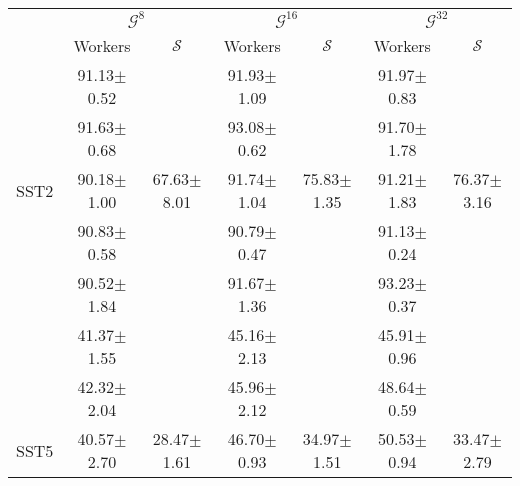 \begin{table*}[h]
\centering\scriptsize\renewcommand{\arraystretch}{1.2}\setlength{\tabcolsep}{4pt}
\begin{tabular}{c|cc|cc|cc|}
\cline{2-7}
                             & \multicolumn{2}{c|}{$\mathcal{G}^8$}                    & \multicolumn{2}{c|}{$\mathcal{G}^{16}$}                 & \multicolumn{2}{c|}{$\mathcal{G}^{32}$}                    \\ \cline{2-7} 
                             & \multicolumn{1}{c|}{Workers}        &  $\mathcal{S}$    & \multicolumn{1}{c|}{Workers}        & $\mathcal{S}$     & \multicolumn{1}{c|}{Workers}        & $\mathcal{S}$             \\ \hline
\multicolumn{1}{|c|}{}       & \multicolumn{1}{c|}{91.13$\pm$0.52} &                   & \multicolumn{1}{c|}{91.93$\pm$1.09} &                   & \multicolumn{1}{c|}{91.97$\pm$0.83} &                   \\
\multicolumn{1}{|c|}{}       & \multicolumn{1}{c|}{91.63$\pm$0.68} &                   & \multicolumn{1}{c|}{93.08$\pm$0.62} &                   & \multicolumn{1}{c|}{91.70$\pm$1.78} &                   \\
\multicolumn{1}{|c|}{SST2}   & \multicolumn{1}{c|}{90.18$\pm$1.00} & 67.63$\pm$8.01    & \multicolumn{1}{c|}{91.74$\pm$1.04} & 75.83$\pm$1.35    & \multicolumn{1}{c|}{91.21$\pm$1.83} & 76.37$\pm$3.16 \\
\multicolumn{1}{|c|}{}       & \multicolumn{1}{c|}{90.83$\pm$0.58} &                   & \multicolumn{1}{c|}{90.79$\pm$0.47} &                   & \multicolumn{1}{c|}{91.13$\pm$0.24} &                   \\
\multicolumn{1}{|c|}{}       & \multicolumn{1}{c|}{90.52$\pm$1.84} &                   & \multicolumn{1}{c|}{91.67$\pm$1.36} &                   & \multicolumn{1}{c|}{93.23$\pm$0.37} &                   \\ \hline
\multicolumn{1}{|c|}{}       & \multicolumn{1}{c|}{41.37$\pm$1.55} &                   & \multicolumn{1}{c|}{45.16$\pm$2.13} &                   & \multicolumn{1}{c|}{45.91$\pm$0.96} &                   \\
\multicolumn{1}{|c|}{}       & \multicolumn{1}{c|}{42.32$\pm$2.04} &                   & \multicolumn{1}{c|}{45.96$\pm$2.12} &                   & \multicolumn{1}{c|}{48.64$\pm$0.59} &                   \\
\multicolumn{1}{|c|}{SST5}   & \multicolumn{1}{c|}{40.57$\pm$2.70} & 28.47$\pm$1.61    & \multicolumn{1}{c|}{46.70$\pm$0.93} & 34.97$\pm$1.51    & \multicolumn{1}{c|}{50.53$\pm$0.94} & 33.47$\pm$2.79 \\

\end{tabular}
\end{table*}

